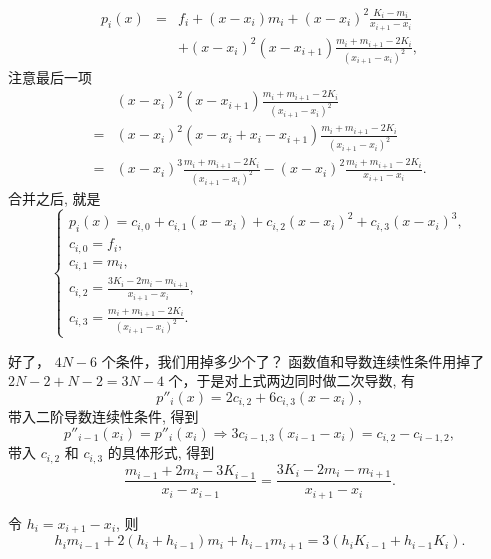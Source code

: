 \documentclass[a4paper]{ctexart}
\begin{document}
{\begin{eqnarray*}
p_i(x) &=& f_i + (x - x_i) m_i + (x - x_i)^2\frac{K_i - m_i}{x_{i + 1} - x_i}  \\
 && + (x - x_i)^2(x - x_{i + 1})\frac{m_i + m_{i+1} - 2K_i}{(x_{i + 1} - x_i)^2} ,
\end{eqnarray*}
注意最后一项
$$
\begin{array}{ll}
&(x - x_i)^2(x - x_{i + 1}) 
\frac{m_i + m_{i + 1} - 2 K_i}{(x_{i + 1} - x_i)^2}\\
=&(x - x_i)^2(x - x_i + x_i - x_{i + 1})
\frac{m_i + m_{i + 1} - 2 K_i}{(x_{i + 1} - x_i)^2}\\
=&(x - x_i)^3\frac{m_i + m_{i + 1} - 2 K_i}{(x_{i + 1} - x_i)^2}
- (x - x_i)^2\frac{m_i + m_{i + 1} - 2 K_i}{x_{i + 1} - x_i}.
\end{array}
$$
合并之后, 就是
$$
\begin{cases}
p_i(x) = c_{i,0} + c_{i,1}(x - x_i) + c_{i,2} (x - x_i)^2 + c_{i,3}(x - x_i)^3, \\
c_{i,0} = f_i, \\
c_{i,1} = m_i, \\
c_{i,2} = \frac{3K_i - 2m_i - m_{i + 1}}{x_{i + 1} - x_i}, \\
c_{i,3} = \frac{m_i + m_{i + 1} - 2K_i}{(x_{i + 1} - x_i)^2}.
\end{cases}
$$


好了， $4 N - 6$ 个条件，我们用掉多少个了？ 函数值和导数连续性条件用掉了 
$2 N - 2 + N - 2 = 3 N - 4$ 个，于是对上式两边同时做二次导数, 有
$$
p''_i(x) = 2 c_{i, 2} + 6 c_{i, 3}(x - x_i),
$$
带入二阶导数连续性条件, 得到
$$
p''_{i - 1}(x_i) = p''_i(x_i) \Rightarrow
3 c_{i - 1, 3}(x_{i - 1} - x_i) = c_{i, 2} - c_{i - 1, 2},
$$
带入 $c_{i,2}$ 和 $c_{i,3}$ 的具体形式, 得到
$$
\frac{m_{i - 1} + 2 m_i - 3 K_{i - 1}}{x_i - x_{i - 1}} =
\frac{3 K_i - 2 m_i - m_{i + 1}}{x_{i + 1} - x_i}.  
$$

令 $h_i = x_{i + 1} - x_i$, 则
$$
h_i m_{i - 1} + 2(h_i + h_{i - 1})m_i + h_{i - 1}m_{i + 1} 
= 3 (h_i K_{i - 1} + h_{i - 1} K_i).
$$

}
\end{document}
